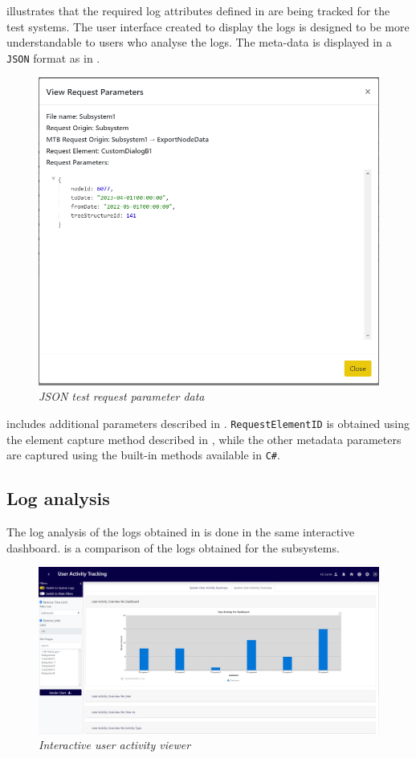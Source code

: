  illustrates that the required log attributes defined in  are being tracked for the test systems. The user interface created to display the logs is designed to be more understandable to users who analyse the logs. The meta-data is displayed in a \texttt{JSON} format as in .

\clearpage

\begin{figure}[!htb]
	\centering %
	\includegraphics[width=0.6\linewidth]{img/ch3/analysis/UAT_request_params.png}
	\caption[JSON test request parameter data]
	{\textit{JSON test request parameter data}}\label{fig:ch3_JSON_Test_Result}
\end{figure}

 includes additional parameters described in . \texttt{RequestElementID} is obtained using the element capture method described in , while the other metadata parameters are captured using the built-in methods available in \texttt{C\#}.

\subsection{Log analysis}
The log analysis of the logs obtained in  is done in the same interactive dashboard.  is a comparison of the logs obtained for the subsystems.

\begin{figure}[!htb]
	\centering %
	\includegraphics[width=0.99\linewidth]{img/ch3/analysis/UAT_menu_analysis.png}
	\caption[Interactive user activity viewer]
	{\textit{Interactive user activity viewer}}\label{fig:ch3_UAT_menuAnalysis}
\end{figure}

